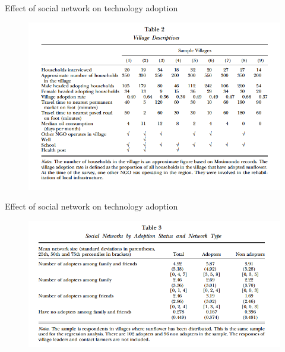 \documentclass{beamer}
\begin{document}
\begin{frame}{Effect of social network on technology adoption}{}
\begin{figure}[h]
\begin{centering}
  \includegraphics[width=\textwidth]{01table2}
   \label{fig:01table2}
\end{centering}
\end{figure}
\end{frame}

\begin{frame}{Effect of social network on technology adoption}{}
\begin{figure}[h]
\begin{centering}
  \includegraphics[width=\textwidth]{01table3}
   \label{fig:01table3}
\end{centering}
\end{figure}
\end{frame}
\end{document}
